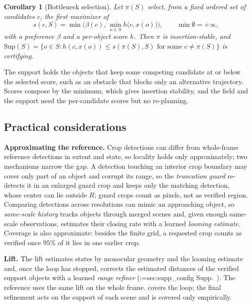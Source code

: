 \documentclass[10pt,twocolumn,letterpaper]{article}
\makeatletter
\newcommand{\Sup}{\mathrm{Sup}}   %
\newcommand{\policy}{\pi}         %
\newtheorem{corollary}{Corollary}
\theoremstyle{definition}
\theoremstyle{remark}
\DeclareRobustCommand{\supp}[1]{\def\supp@list{}\@for\supp@i:=#1\do{\ifx\supp@list\@empty\edef\supp@list{S-\supp@i}\else\edef\supp@list{\supp@list,S-\supp@i}\fi}%
\edef\supp@cmd{\noexpand\Cref*{\supp@list}}Supp.~\supp@cmd}
\makeatother
\begin{document}
\begin{corollary}[Bottleneck selection]
Let $\policy(S)$ select, from a fixed ordered set of candidates $c$, the first maximizer of
\begin{equation*}
s(c,S)=\min\Big(\beta(c),\,\min_{o\in S}h\big(c,x(o)\big)\Big),\qquad \min\emptyset=+\infty,
\end{equation*}
with a preference $\beta$ and a per-object score $h$.
Then $\policy$ is insertion-stable, and $\Sup(S)=\{o\in S:h(c,x(o))\le s(\policy(S),S)\text{ for some }c\neq\policy(S)\}$ is certifying.\label{cor:bottleneck}
\end{corollary}

The support holds the objects that keep some competing candidate at or below the selected score, such as an obstacle that blocks only an alternative trajectory.
Scores compose by the minimum, which gives insertion stability, and the field and the support need the per-candidate scores but no re-planning.

\subsection{Practical considerations}
\label{sec:practice}

\noindent\textbf{Approximating the reference.}
Crop detections can differ from whole-frame reference detections in extent and state, so locality holds only approximately; two mechanisms narrow the gap.
A detection touching an interior crop boundary may cover only part of an object and corrupt its range, so the \emph{truncation guard} re-detects it in an enlarged guard crop and keeps only the matching detection, whose center can lie outside $R$; guard crops count as pixels, not as verified region.
Comparing detections across resolutions can mimic an approaching object, so \emph{same-scale history} tracks objects through merged scenes and, given enough same-scale observations, estimates their closing rate with a learned \emph{looming estimate}.
Coverage is also approximate: besides the finite grid, a requested crop counts as verified once $95\%$ of it lies in one earlier crop.

\noindent\textbf{Lift.}
The lift estimates states by monocular geometry and the looming estimate and, once the loop has stopped, corrects the estimated distances of the verified support objects with a learned \emph{range refiner} (\supp{sec:supp_config}).
The reference uses the same lift on the whole frame.
 covers the loop; the final refinement acts on the support of each scene and is covered only empirically.
\end{document}
